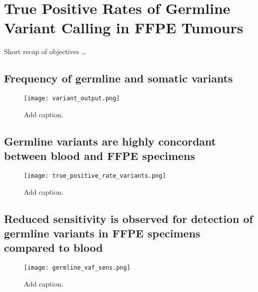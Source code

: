 
\chapter{True Positive Rates of Germline Variant Calling in FFPE Tumours}
\label{ch:TruePositiveRateofGermlineVariantCallinginFFPETumours}

Short recap of objectives \ldots

\section{Frequency of germline and somatic variants}
\label{sec:Frequencyofgermlineandsomaticvariants}

\begin{figure}[H]
\centering
	\texttt{[image: variant\_output.png]}
	\caption{Add caption.}
	\label{fig:variant_output}
\end{figure}

\section{Germline variants are highly concordant between blood and FFPE specimens}
\label{sec:GermlinevariantsarehighlyconcordantbetweenbloodandFFPEspecimens}

\begin{figure}[H]
\centering
	\texttt{[image: true\_positive\_rate\_variants.png]}
	\caption{Add caption.}
	\label{fig:true_positive_rate_variants}
\end{figure}

\section{Reduced sensitivity is observed for detection of germline variants in FFPE specimens compared to blood}
\label{sec:ReducedsensitivityisobservedfordetectionofgermlinevariantsinFFPEspecimenscomparedtoblood}

\begin{figure}[H]
	\texttt{[image: germline\_vaf\_sens.png]}
	\caption{Add caption.}
	\label{fig:germline_vaf_sens}
\end{figure}

